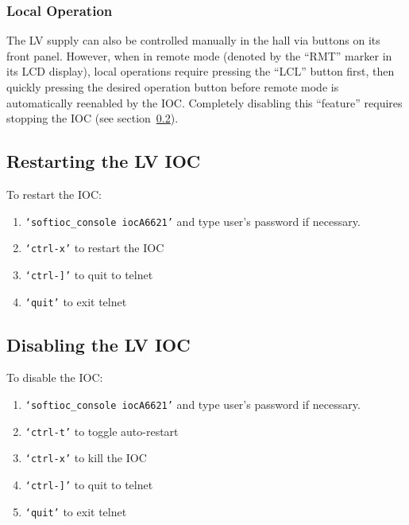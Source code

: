 \documentclass[12pt]{article}
\begin{document}
\subsubsection{Local Operation}\label{sec:lvlocalops}
The LV supply can also be controlled manually in the hall via buttons on its front panel.  However, when in remote mode (denoted by the ``RMT'' marker in its LCD display), local operations require pressing the ``LCL'' button first, then quickly pressing the desired operation button before remote mode is automatically reenabled by the IOC.  Completely disabling this ``feature'' requires stopping the IOC (see section~\ref{lviocstop}).

\subsection{Restarting the LV IOC}
   To restart the IOC:
   {\footnotesize
   \begin{enumerate}
       \item \texttt{`softioc\_console iocA6621'} and type user's password if necessary.
       \item \texttt{`ctrl-x'} to restart the IOC
       \item \texttt{`ctrl-]'} to quit to telnet
       \item \texttt{`quit'} to exit telnet
   \end{enumerate}
   }

\subsection{Disabling the LV IOC}\label{lviocstop}
   To disable the IOC:
   {\footnotesize
   \begin{enumerate}
       \item \texttt{`softioc\_console iocA6621'} and type user's password if necessary.
       \item \texttt{`ctrl-t'} to toggle auto-restart
       \item \texttt{`ctrl-x'} to kill the IOC
       \item \texttt{`ctrl-]'} to quit to telnet
       \item \texttt{`quit'} to exit telnet
   \end{enumerate}
   }
\end{document}

